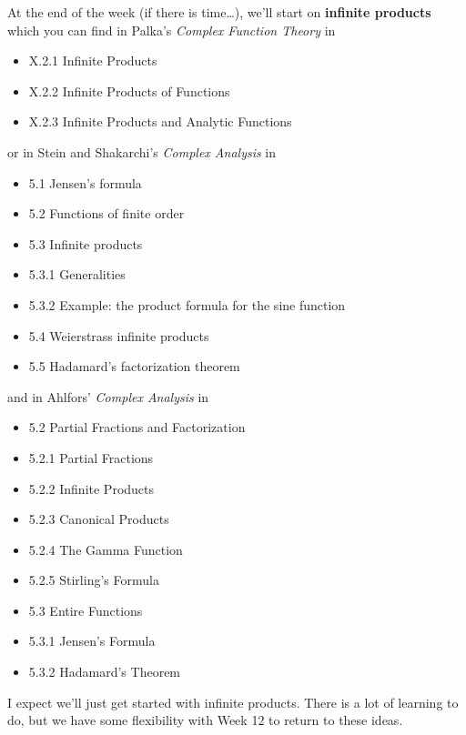 \documentclass{homework}
\begin{document}
At the end of the week (if there is time\ldots), we'll start on
\textbf{infinite products} which you can find in Palka's
\textit{Complex Function Theory} in
\begin{itemize}  
\item X.2.1 Infinite Products
\item X.2.2 Infinite Products of Functions
\item X.2.3 Infinite Products and Analytic Functions
\end{itemize}
or in Stein and Shakarchi's \textit{Complex Analysis} in
\begin{itemize}
\item 5.1 Jensen's formula
\item 5.2 Functions of finite order
\item 5.3 Infinite products
\item 5.3.1 Generalities
\item 5.3.2 Example: the product formula for the sine function
\item 5.4 Weierstrass infinite products
\item 5.5 Hadamard's factorization theorem
\end{itemize}
and in Ahlfors' \textit{Complex Analysis} in
\begin{itemize}
\item 5.2 Partial Fractions and Factorization
\item 5.2.1 Partial Fractions
\item 5.2.2 Infinite Products
\item 5.2.3 Canonical Products
\item 5.2.4 The Gamma Function
\item 5.2.5 Stirling's Formula
\item 5.3 Entire Functions
\item 5.3.1 Jensen's Formula
\item 5.3.2 Hadamard's Theorem
\end{itemize}
I expect we'll just get started with infinite products.  There is a
lot of learning to do, but we have some flexibility with Week 12 to
return to these ideas.
\end{document}
